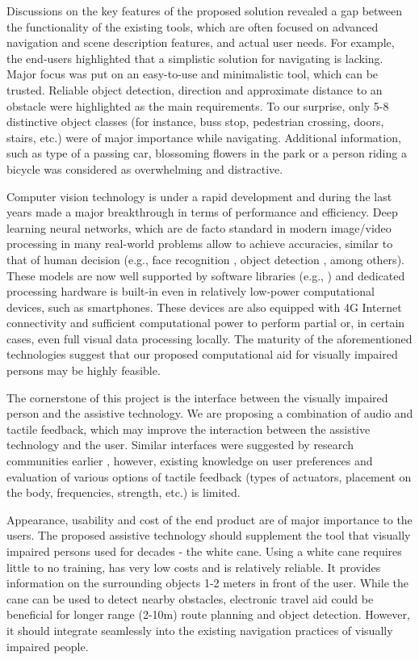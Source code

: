\documentclass[10pt,conference,compsocconf]{IEEEtran}
\begin{document}
Discussions on the key features of the proposed solution revealed a gap between the functionality of the existing tools, which are often focused on advanced navigation and scene description features, and actual user needs. For example, the end-users highlighted that a simplistic solution for navigating is lacking. Major focus was put on an easy-to-use and minimalistic tool, which can be trusted. Reliable object detection, direction and approximate distance to an obstacle were highlighted as the main requirements. To our surprise, only 5-8 distinctive object classes (for instance, buss stop, pedestrian crossing, doors, stairs, etc.) were of major importance while navigating. Additional information, such as type of a passing car, blossoming flowers in the park or a person riding a bicycle was considered as overwhelming and distractive. 

Computer vision technology is under a rapid development and during the last years made a major breakthrough in terms of performance and efficiency. Deep learning neural networks, which are de facto standard in modern image/video processing in many real-world problems allow to achieve accuracies, similar to that of human decision (e.g., face recognition \cite{Amos}, object detection \cite{Ren}, among others). These models are now well supported by software libraries (e.g., \cite{Tensorflow}) and dedicated processing hardware is built-in even in relatively low-power computational devices, such as smartphones. These devices are also equipped with 4G Internet connectivity and sufficient computational power to perform partial or, in certain cases, even full visual data processing locally. The maturity of the aforementioned technologies suggest that our proposed computational aid for visually impaired persons may be highly feasible. 


The cornerstone of this project is the interface between the visually impaired person and the assistive technology. We are proposing a combination of audio and tactile feedback, which may improve the interaction between the assistive technology and the user. Similar interfaces were suggested by research communities earlier \cite{Poggi}\cite{Zientara}, however, existing knowledge on user preferences and evaluation of various options of tactile feedback (types of actuators, placement on the body, frequencies, strength, etc.) is limited. 

Appearance, usability and cost of the end product are of major importance to the users. The proposed assistive technology should supplement the tool that visually impaired persons used for decades - the white cane. Using a white cane requires little to no training, has very low costs and is relatively reliable. It provides information on the surrounding objects 1-2 meters in front of the user. While the cane can be used to detect nearby obstacles, electronic travel aid could be beneficial for longer range (2-10m) route planning and object detection. However, it should integrate seamlessly into the existing navigation practices of visually impaired people. 
\end{document}
